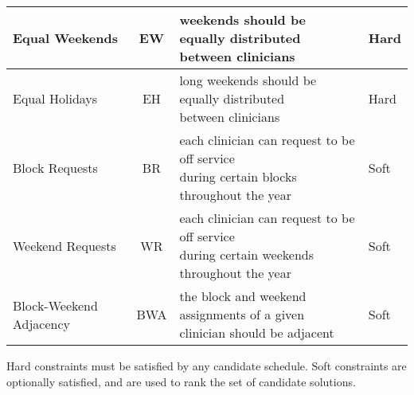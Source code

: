 \begin{table}[h]
\begin{tabular}{ l c l l }
		Equal Weekends                                                                  & EW                    & \makecell[l]{weekends should be equally
			distributed \\ between clinicians}                                                        & Hard          \\ \hline
		Equal Holidays                                                                  & EH                    & \makecell[l]{long weekends should be equally
			distributed \\ between clinicians}                                                   & Hard          \\ \hline
		Block Requests                                                                  & BR                    & \makecell[l]{each clinician can request to be
			off service \\ during certain blocks throughout the year}                           & Soft          \\ \hline
		Weekend Requests                                                                & WR                    & \makecell[l]{each clinician can request to be
			off service \\ during certain weekends throughout the year}                         & Soft          \\ \hline
		Block-Weekend Adjacency                                                         & BWA                   & \makecell[l]{the block and weekend
			assignments of a given \\ clinician should be adjacent}                                        & Soft          \\ \bottomrule
	\end{tabular}
\footnotesize\raggedright
Hard constraints must be satisfied by any candidate schedule. 
Soft constraints are optionally satisfied, and are used to rank the set of candidate solutions.
\end{table}